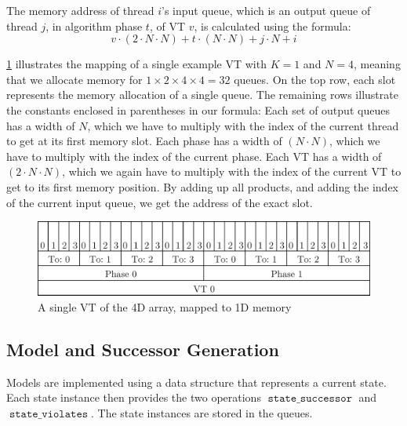 \documentclass[
fancyheadings, %
%
%
]{stsreprt}
\DeclareMathOperator{\sSuccessor}{\texttt{state\_successor}}
\DeclareMathOperator{\sViolates}{\texttt{state\_violates}}
\begin{document}
The memory address of thread $i$'s input queue, which is an output queue of thread $j$, in algorithm phase $t$, of VT $v$, is calculated using the formula:
\[v \cdot (2 \cdot N \cdot N) + t \cdot (N \cdot N) + j \cdot N + i\]

\cref{fig:4d-mapped-memory} illustrates the mapping of a single example VT with $K=1$ and $N=4$, meaning that we allocate memory for $1 \times 2 \times 4 \times 4 = 32$ queues.
On the top row, each slot represents the memory allocation of a single queue.
The remaining rows illustrate the constants enclosed in parentheses in our formula:
Each set of output queues has a width of $N$, which we have to multiply with the index of the current thread to get at its first memory slot.
Each phase has a width of $(N \cdot N)$, which we have to multiply with the index of the current phase.
Each VT has a width of $(2 \cdot N \cdot N)$, which we again have to multiply with the index of the current VT to get to its first memory position.
By adding up all products, and adding the index of the current input queue, we get the address of the exact slot.

\begin{figure}
    \includegraphics[width=\textwidth]{figures/4d-mapped-memory}
    \caption{A single VT of the 4D array, mapped to 1D memory}
    \label{fig:4d-mapped-memory}
\end{figure}

\subsection{Model and Successor Generation}
\label{section:implementation:successor-generation}

Models are implemented using a data structure that represents a current state.
Each state instance then provides the two operations $\sSuccessor$ and $\sViolates$.
The state instances are stored in the queues.
\end{document}
